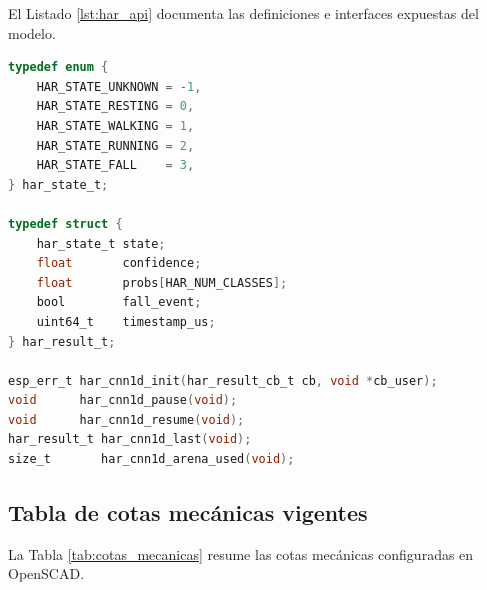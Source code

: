 \documentclass[letterpaper,11pt]{article}
\newcommand{\rtabla}[1]{Tabla \ref{#1}}
\begin{document}
El Listado \ref{lst:har_api} documenta las definiciones e interfaces expuestas del modelo.

\begin{lstlisting}[language=C, caption={Definiciones públicas en lib/har\_cnn1d/har\_cnn1d.h.}, label={lst:har_api}]
typedef enum {
    HAR_STATE_UNKNOWN = -1,
    HAR_STATE_RESTING = 0,
    HAR_STATE_WALKING = 1,
    HAR_STATE_RUNNING = 2,
    HAR_STATE_FALL    = 3,
} har_state_t;

typedef struct {
    har_state_t state;
    float       confidence;
    float       probs[HAR_NUM_CLASSES];
    bool        fall_event;
    uint64_t    timestamp_us;
} har_result_t;

esp_err_t har_cnn1d_init(har_result_cb_t cb, void *cb_user);
void      har_cnn1d_pause(void);
void      har_cnn1d_resume(void);
har_result_t har_cnn1d_last(void);
size_t       har_cnn1d_arena_used(void);
\end{lstlisting}

\newpage

\subsection{Tabla de cotas mecánicas vigentes}\label{sec:anexo_cotas}

La \rtabla{tab:cotas_mecanicas} resume las cotas mecánicas configuradas en OpenSCAD.
\end{document}
